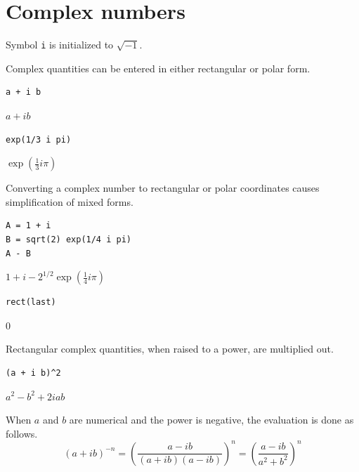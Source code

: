 
\newpage

\section{Complex numbers}

Symbol \verb$i$ is initialized to $\sqrt{-1}$.

\bigskip

Complex quantities can be entered in either rectangular or polar form.

{\color{blue}
\begin{verbatim}
a + i b
\end{verbatim}
}

$\displaystyle a+ib$

{\color{blue}
\begin{verbatim}
exp(1/3 i pi)
\end{verbatim}
}

$\displaystyle \exp\left(\tfrac{1}{3}i\pi\right)$

\bigskip

Converting a complex number to rectangular or polar coordinates causes
simplification of mixed forms.

{\color{blue}
\begin{verbatim}
A = 1 + i
B = sqrt(2) exp(1/4 i pi)
A - B
\end{verbatim}
}

$\displaystyle 1+i-2^{1/2}\exp\left(\tfrac{1}{4}i\pi\right)$

{\color{blue}
\begin{verbatim}
rect(last)
\end{verbatim}
}

$\displaystyle 0$

\bigskip

Rectangular complex quantities, when raised to a power, are multiplied out.

{\color{blue}
\begin{verbatim}
(a + i b)^2
\end{verbatim}
}

$\displaystyle a^2-b^2+2iab$

\bigskip

When $a$ and $b$ are numerical and the power is negative, the evaluation is done as follows.
\begin{equation*}
(a+ib)^{-n}
=\left(\frac{a-ib}{(a+ib)(a-ib)}\right)^n=
\left(\frac{a-ib}{a^2+b^2}\right)^n
\end{equation*}

